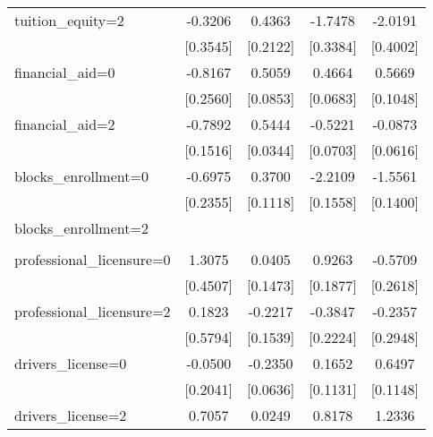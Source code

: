\begin{table}[htbp]
\begin{tabular}{l*{4}{c}}
\addlinespace
tuition\_equity=2    &     -0.3206         &      0.4363\sym{**} &     -1.7478\sym{***}&     -2.0191\sym{***}\\
                    &    [0.3545]         &    [0.2122]         &    [0.3384]         &    [0.4002]         \\
\addlinespace
financial\_aid=0     &     -0.8167\sym{***}&      0.5059\sym{***}&      0.4664\sym{***}&      0.5669\sym{***}\\
                    &    [0.2560]         &    [0.0853]         &    [0.0683]         &    [0.1048]         \\
\addlinespace
financial\_aid=2     &     -0.7892\sym{***}&      0.5444\sym{***}&     -0.5221\sym{***}&     -0.0873         \\
                    &    [0.1516]         &    [0.0344]         &    [0.0703]         &    [0.0616]         \\
\addlinespace
blocks\_enrollment=0 &     -0.6975\sym{***}&      0.3700\sym{***}&     -2.2109\sym{***}&     -1.5561\sym{***}\\
                    &    [0.2355]         &    [0.1118]         &    [0.1558]         &    [0.1400]         \\
\addlinespace
blocks\_enrollment=2 &                     &                     &                     &                     \\
                    &                     &                     &                     &                     \\
\addlinespace
professional\_licensure=0&      1.3075\sym{***}&      0.0405         &      0.9263\sym{***}&     -0.5709\sym{**} \\
                    &    [0.4507]         &    [0.1473]         &    [0.1877]         &    [0.2618]         \\
\addlinespace
professional\_licensure=2&      0.1823         &     -0.2217         &     -0.3847\sym{*}  &     -0.2357         \\
                    &    [0.5794]         &    [0.1539]         &    [0.2224]         &    [0.2948]         \\
\addlinespace
drivers\_license=0   &     -0.0500         &     -0.2350\sym{***}&      0.1652         &      0.6497\sym{***}\\
                    &    [0.2041]         &    [0.0636]         &    [0.1131]         &    [0.1148]         \\
\addlinespace
drivers\_license=2   &      0.7057\sym{**} &      0.0249         &      0.8178\sym{***}&      1.2336\sym{***}\\

\end{tabular}
\end{table}
